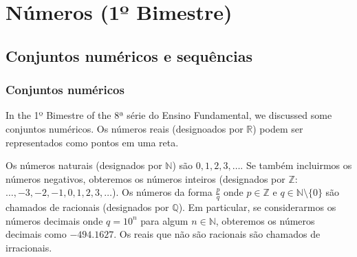\chapter{Números (1º Bimestre)}

\section{Conjuntos numéricos e sequências}

\subsection*{Conjuntos numéricos}

In the 1º Bimestre of the 8ª série do Ensino Fundamental, we discussed some
conjuntos numéricos. Os números reais (designoados por $\mathbb R$) podem ser
representados como pontos em uma reta.

\begin{center}
\end{center}

Os números naturais (designados por $\mathbb N$) são $0, 1, 2, 3, \ldots$. Se
também incluirmos os números negativos, obteremos os números inteiros
(designados por $\mathbb Z$: $\ldots, -3, -2, -1, 0, 1, 2, 3, \ldots$).
Os números da forma $\frac{p}{q}$ onde $p \in \mathbb Z$ e $q \in \mathbb N
\setminus \{0\}$ são chamados de racionais (designados por $\mathbb Q$). Em
particular, se considerarmos os números decimais onde $q = 10^n$ para algum $n
\in \mathbb N$, obteremos os números decimais como $-494.1627$.
Os reais que não são racionais são chamados de irracionais.

\begin{center}
\end{center}

